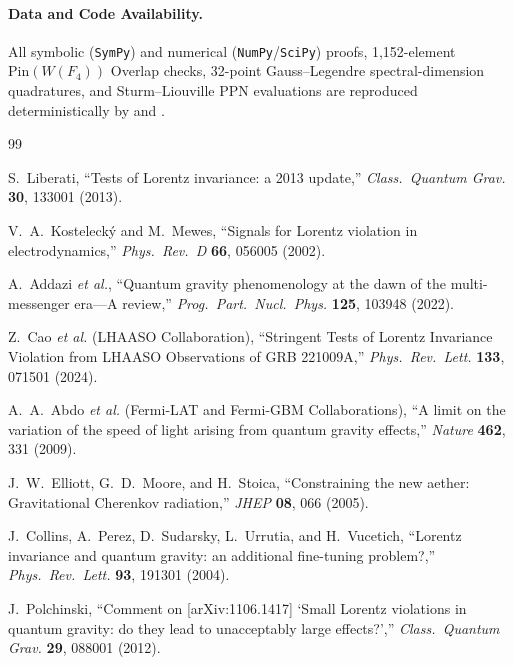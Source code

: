\documentclass[11pt,a4paper]{article}
\begin{document}
\paragraph{Data and Code Availability.}
All symbolic (\texttt{SymPy}) and numerical (\texttt{NumPy}/\texttt{SciPy}) proofs, 1,152-element $\mathrm{Pin}(W(F_4))$ Overlap checks, 32-point Gauss--Legendre spectral-dimension quadratures, and Sturm--Liouville PPN evaluations are reproduced deterministically by  and .

\begin{thebibliography}{99}
\raggedright
\small

S.~Liberati, ``Tests of Lorentz invariance: a 2013 update,'' \emph{Class.\ Quantum Grav.} \textbf{30}, 133001 (2013).

V.~A.~Kosteleck\'y and M.~Mewes, ``Signals for Lorentz violation in electrodynamics,'' \emph{Phys.\ Rev.\ D} \textbf{66}, 056005 (2002).

A.~Addazi \emph{et al.}, ``Quantum gravity phenomenology at the dawn of the multi-messenger era---A review,'' \emph{Prog.\ Part.\ Nucl.\ Phys.} \textbf{125}, 103948 (2022).

Z.~Cao \emph{et al.} (LHAASO Collaboration), ``Stringent Tests of Lorentz Invariance Violation from LHAASO Observations of GRB 221009A,'' \emph{Phys.\ Rev.\ Lett.} \textbf{133}, 071501 (2024).

A.~A.~Abdo \emph{et al.} (Fermi-LAT and Fermi-GBM Collaborations), ``A limit on the variation of the speed of light arising from quantum gravity effects,'' \emph{Nature} \textbf{462}, 331 (2009).

J.~W.~Elliott, G.~D.~Moore, and H.~Stoica, ``Constraining the new aether: Gravitational Cherenkov radiation,'' \emph{JHEP} \textbf{08}, 066 (2005).

J.~Collins, A.~Perez, D.~Sudarsky, L.~Urrutia, and H.~Vucetich, ``Lorentz invariance and quantum gravity: an additional fine-tuning problem?,'' \emph{Phys.\ Rev.\ Lett.} \textbf{93}, 191301 (2004).

J.~Polchinski, ``Comment on [arXiv:1106.1417] `Small Lorentz violations in quantum gravity: do they lead to unacceptably large effects?','' \emph{Class.\ Quantum Grav.} \textbf{29}, 088001 (2012).


\end{thebibliography}
\end{document}
